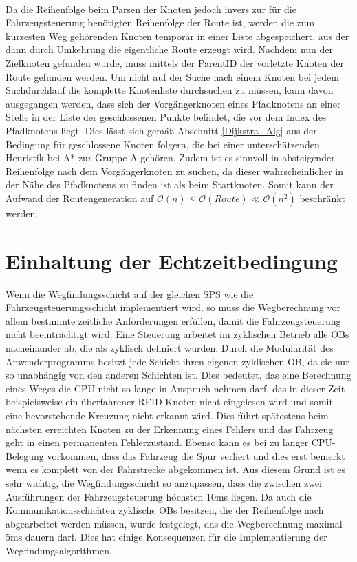 			\\
			Da die Reihenfolge beim Parsen der Knoten jedoch invers zur für die Fahrzeugsteuerung benötigten Reihenfolge der Route ist, werden die zum kürzesten Weg gehörenden Knoten temporär in einer Liste abgespeichert, aus der dann durch Umkehrung die eigentliche Route erzeugt wird. Nachdem nun der Zielknoten gefunden wurde, muss mittels der ParentID der vorletzte Knoten der Route gefunden werden. Um nicht auf der Suche nach einem Knoten bei jedem Suchdurchlauf die komplette Knotenliste durchsuchen zu müssen, kann davon ausgegangen werden, dass sich der Vorgängerknoten eines Pfadknotens an einer Stelle in der Liste der geschlossenen Punkte befindet, die vor dem  Index des Pfadknotens liegt. Dies lässt sich gemäß Abschnitt \ref{Dijkstra_Alg} aus der Bedingung für geschlossene Knoten folgern, die bei einer unterschätzenden Heuristik bei A* zur Gruppe A gehören. Zudem ist es sinnvoll in absteigender Reihenfolge nach dem Vorgängerknoten zu suchen, da dieser wahrscheinlicher in der Nähe des Pfadknotens zu finden ist als beim Startknoten. Somit kann der Aufwand der Routengeneration auf $\mathcal{O}(n)\le \mathcal{O}(Route)\ll \mathcal{O}(n^2)$ beschränkt werden.
			
			
	\section{Einhaltung der Echtzeitbedingung}
		
		Wenn die Wegfindungsschicht auf der gleichen \ac{SPS} wie die Fahrzeugsteuerungsschicht implementiert wird, so muss die Wegberechnung vor allem bestimmte zeitliche Anforderungen erfüllen, damit die Fahrzeugsteuerung nicht beeinträchtigt wird. Eine Steuerung arbeitet im zyklischen Betrieb alle \ac{OB}s nacheinander ab, die als zyklisch definiert wurden. Durch die Modularität des Anwenderprogramms besitzt jede Schicht ihren eigenen zyklischen \ac{OB}, da sie nur so unabhängig von den anderen Schichten ist.  Dies bedeutet, das eine Berechnung eines Weges die CPU nicht so lange in Anspruch nehmen darf, das in dieser Zeit beispielsweise ein überfahrener RFID-Knoten nicht eingelesen wird und somit eine  bevorstehende Kreuzung nicht erkannt wird. Dies führt spätestens beim nächsten erreichten Knoten zu der Erkennung eines Fehlers und das Fahrzeug geht in einen permanenten Fehlerzustand. Ebenso kann es bei zu langer CPU-Belegung vorkommen, dass das Fahrzeug die Spur verliert und dies erst bemerkt wenn es komplett von der Fahrstrecke abgekommen ist. Aus diesem Grund ist es sehr wichtig, die Wegfindungsschicht so anzupassen, dass die zwischen zwei Ausführungen der Fahrzeugsteuerung höchsten 10ms liegen. Da auch die Kommunikationsschichten zyklische \ac{OB}s besitzen, die der Reihenfolge nach abgearbeitet werden müssen, wurde festgelegt, das die Wegberechnung maximal 5ms dauern darf. Dies hat einige Konsequenzen für die Implementierung der Wegfindungsalgorithmen.
		
